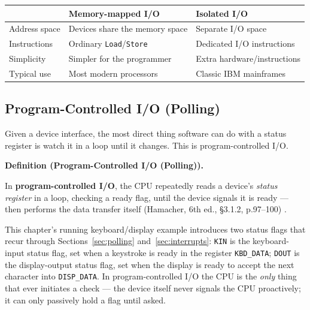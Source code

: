 \documentclass[11pt]{article}
\newenvironment{definitionbox}[1]{%
  \par\noindent\textbf{Definition (#1).}\ \itshape
}{\par\vspace{0.3em}}
\begin{document}
\begin{center}
\footnotesize
\begin{tabular}{@{}lll@{}}
\toprule
& \textbf{Memory-mapped I/O} & \textbf{Isolated I/O} \\
\midrule
Address space & Devices share the memory space & Separate I/O space \\
Instructions & Ordinary \texttt{Load}/\texttt{Store} & Dedicated I/O instructions \\
Simplicity & Simpler for the programmer & Extra hardware/instructions \\
Typical use & Most modern processors & Classic IBM mainframes \\
\bottomrule
\end{tabular}
\end{center}

\subsection{Program-Controlled I/O (Polling)}

Given a device interface, the most direct thing software can do with a status register is watch it in a loop until it changes. This is program-controlled I/O.

\begin{definitionbox}{Program-Controlled I/O (Polling)}
In \textbf{program-controlled I/O}, the CPU repeatedly reads a device's \emph{status register} in a loop, checking a ready flag, until the device signals it is ready --- then performs the data transfer itself (Hamacher, 6th ed., \S3.1.2, p.97--100) \cite{Hamacher2002_computer_organization}.
\end{definitionbox}

This chapter's running keyboard/display example introduces two status flags that recur through Sections~\ref{sec:polling} and~\ref{sec:interrupts}: \texttt{KIN} is the keyboard-input status flag, set when a keystroke is ready in the register \texttt{KBD\_DATA}; \texttt{DOUT} is the display-output status flag, set when the display is ready to accept the next character into \texttt{DISP\_DATA}. In program-controlled I/O the CPU is the \emph{only} thing that ever initiates a check --- the device itself never signals the CPU proactively; it can only passively hold a flag until asked.
\end{document}
